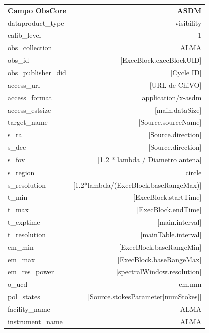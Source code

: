 \begin{table}[ht]
    \centering
    \begin{tabular}{lr}
        \textbf{Campo ObsCore} & \textbf{ASDM} \\
        dataproduct\_type      & visibility \\
        calib\_level           & 1 \\
        obs\_collection        & ALMA \\
        obs\_id                & [ExecBlock.execBlockUID] \\
        obs\_publisher\_did    & [Cycle ID] \\
        access\_url            & [URL de ChiVO] \\
        access\_format         & application/x-asdm \\
        access\_estsize        & [main.dataSize] \\
        target\_name           & [Source.sourceName] \\
        s\_ra                  & [Source.direction] \\
        s\_dec                 & [Source.direction] \\
        s\_fov                 & [1.2 * lambda / Diametro antena] \\
        s\_region              & circle \\
        s\_resolution          & [1.2*lambda/(ExecBlock.baseRangeMax)] \\
        t\_min                 & [ExecBlock.startTime] \\
        t\_max                 & [ExecBlock.endTime] \\
        t\_exptime             & [main.interval] \\
        t\_resolution          & [mainTable.interval] \\
        em\_min                & [ExecBlock.baseRangeMin] \\
        em\_max                & [ExecBlock.baseRangeMax] \\
        em\_res\_power         & [spectralWindow.resolution] \\
        o\_ucd                 & em.mm \\
        pol\_states            & [Source.stokesParameter[numStokes]] \\
        facility\_name         & ALMA \\
        instrument\_name       & ALMA \\
    \end{tabular}
    \label{table:obsasdm}
\end{table}

